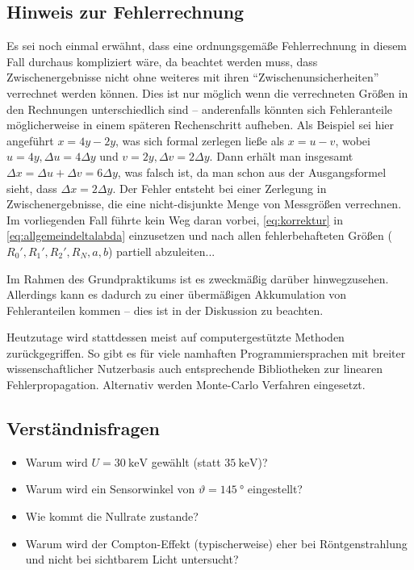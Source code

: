 \documentclass[ngerman,a4paper,twocolumn,twoside]{scrartcl}
\begin{document}
\subsection*{Hinweis zur Fehlerrechnung}
Es sei noch einmal erwähnt, dass eine ordnungsgemäße Fehlerrechnung in diesem Fall durchaus kompliziert wäre, da beachtet werden muss, dass Zwischenergebnisse nicht ohne weiteres mit ihren \enquote{Zwischenunsicherheiten} verrechnet werden können. Dies ist nur möglich wenn die verrechneten Größen in den Rechnungen unterschiedlich sind -- anderenfalls könnten sich Fehleranteile möglicherweise in einem späteren Rechenschritt aufheben. Als Beispiel sei hier angeführt $x=4y-2y$, was sich formal zerlegen ließe als $x=u-v$, wobei $u=4y, \Delta u=4\Delta y$ und $v=2y, \Delta v=2\Delta y$. Dann erhält man insgesamt $\Delta x = \Delta u + \Delta v=6\Delta y$, was falsch ist, da man schon aus der Ausgangsformel sieht, dass $\Delta x=2\Delta y$. Der Fehler entsteht bei einer Zerlegung in Zwischenergebnisse, die eine nicht-disjunkte Menge von Messgrößen verrechnen. Im vorliegenden Fall führte kein Weg daran vorbei, \cref{eq:korrektur} in \cref{eq:allgemeindeltalabda} einzusetzen und nach allen fehlerbehafteten Größen ($R_0',R_1',R_2',R_N,a,b$) partiell abzuleiten...
\par
Im Rahmen des Grundpraktikums ist es zweckmäßig darüber hinwegzusehen. Allerdings kann es dadurch zu einer übermäßigen Akkumulation von Fehleranteilen kommen -- dies ist in der Diskussion zu beachten.
\par
Heutzutage wird stattdessen meist auf computergestützte Methoden zurückgegriffen. So gibt es für viele namhaften Programmiersprachen mit breiter wissenschaftlicher Nutzerbasis auch entsprechende Bibliotheken zur linearen Fehlerpropagation. Alternativ werden Monte-Carlo Verfahren eingesetzt.
\subsection*{Verständnisfragen}
\begin{itemize}
\item Warum wird $U=\SI{30}{\kilo\electronvolt}$ gewählt (statt $\SI{35}{\kilo\electronvolt}$)?
\item Warum wird ein Sensorwinkel von $\vartheta=\SI{145}{\degree}$ eingestellt?
\item Wie kommt die Nullrate zustande?
\item Warum wird der Compton-Effekt (typischerweise) eher bei Röntgenstrahlung und nicht bei sichtbarem Licht untersucht?
\end{itemize}
\end{document}
